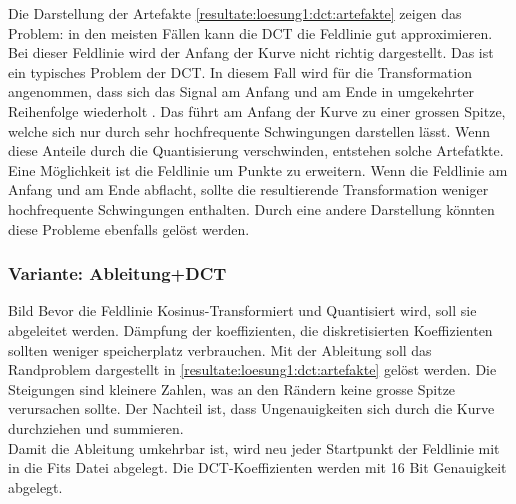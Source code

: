 Die Darstellung der Artefakte \ref{resultate:loesung1:dct:artefakte} zeigen das Problem: in den meisten Fällen kann die DCT die Feldlinie gut approximieren. Bei dieser Feldlinie wird der Anfang der Kurve nicht richtig dargestellt. Das ist ein typisches Problem der DCT. In diesem Fall wird für die Transformation angenommen, dass sich das Signal am Anfang und am Ende in umgekehrter Reihenfolge wiederholt \cite{wiki:dct}. Das führt am Anfang der Kurve zu einer grossen Spitze, welche sich nur durch sehr hochfrequente Schwingungen darstellen lässt.  Wenn diese Anteile durch die Quantisierung verschwinden, entstehen solche Artefatkte.\\
Eine Möglichkeit ist die Feldlinie um Punkte zu erweitern. Wenn die Feldlinie am Anfang und am Ende abflacht, sollte die resultierende Transformation weniger hochfrequente Schwingungen enthalten. Durch eine andere Darstellung könnten diese Probleme ebenfalls gelöst werden.

\subsubsection{Variante: Ableitung+DCT}\label{resultate:dct:ableitung_dct}
Bild
Bevor die Feldlinie Kosinus-Transformiert und Quantisiert wird, soll sie abgeleitet werden. Dämpfung der koeffizienten, die diskretisierten Koeffizienten sollten weniger speicherplatz verbrauchen. Mit der Ableitung soll das Randproblem dargestellt in \ref{resultate:loesung1:dct:artefakte} gelöst werden. Die Steigungen sind kleinere Zahlen, was an den Rändern keine grosse Spitze verursachen sollte. Der Nachteil ist, dass Ungenauigkeiten sich durch die Kurve durchziehen und summieren.\\
Damit die Ableitung umkehrbar ist, wird neu jeder Startpunkt der Feldlinie mit in die Fits Datei abgelegt. Die DCT-Koeffizienten werden mit 16 Bit Genauigkeit abgelegt.\\

